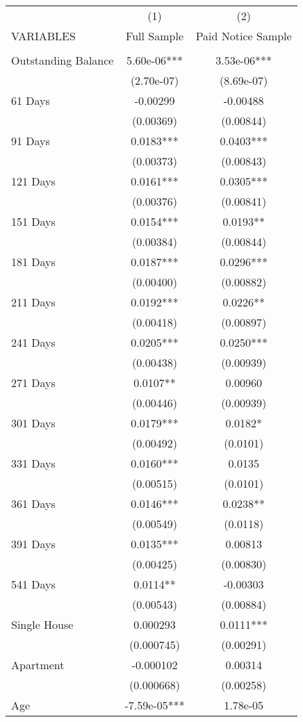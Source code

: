 \begin{tabular}{lcc} \hline
 & (1) & (2) \\
VARIABLES & Full Sample & Paid Notice Sample \\ \hline
 &  &  \\
Outstanding Balance & 5.60e-06*** & 3.53e-06*** \\
 & (2.70e-07) & (8.69e-07) \\
61 Days & -0.00299 & -0.00488 \\
 & (0.00369) & (0.00844) \\
91 Days & 0.0183*** & 0.0403*** \\
 & (0.00373) & (0.00843) \\
121 Days & 0.0161*** & 0.0305*** \\
 & (0.00376) & (0.00841) \\
151 Days & 0.0154*** & 0.0193** \\
 & (0.00384) & (0.00844) \\
181 Days & 0.0187*** & 0.0296*** \\
 & (0.00400) & (0.00882) \\
211 Days & 0.0192*** & 0.0226** \\
 & (0.00418) & (0.00897) \\
241 Days & 0.0205*** & 0.0250*** \\
 & (0.00438) & (0.00939) \\
271 Days & 0.0107** & 0.00960 \\
 & (0.00446) & (0.00939) \\
301 Days & 0.0179*** & 0.0182* \\
 & (0.00492) & (0.0101) \\
331 Days & 0.0160*** & 0.0135 \\
 & (0.00515) & (0.0101) \\
361 Days & 0.0146*** & 0.0238** \\
 & (0.00549) & (0.0118) \\
391 Days & 0.0135*** & 0.00813 \\
 & (0.00425) & (0.00830) \\
541 Days & 0.0114** & -0.00303 \\
 & (0.00543) & (0.00884) \\
Single House & 0.000293 & 0.0111*** \\
 & (0.000745) & (0.00291) \\
Apartment & -0.000102 & 0.00314 \\
 & (0.000668) & (0.00258) \\
Age & -7.59e-05*** & 1.78e-05 \\

\end{tabular}

